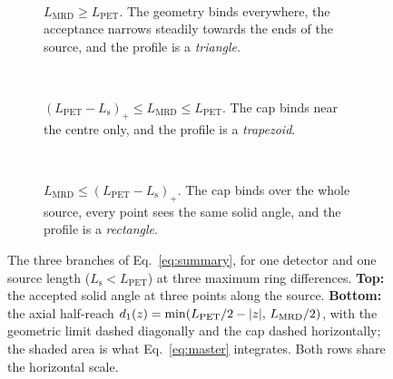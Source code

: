 \documentclass[11pt,a4paper]{article}
\newcommand{\Lpet}{L_{\mathrm{PET}}}
\newcommand{\Lsrc}{L_{\mathrm{s}}}
\newcommand{\Lmrd}{L_{\mathrm{MRD}}}
\newcommand{\Sid}{S_{\mathrm{ideal}}}
\DeclarePairedDelimiter{\abs}{\lvert}{\rvert}
\begin{document}

\begin{figure}[tbp]
\centering
\begin{subfigure}[t]{0.32\textwidth}\centering
  \\[0.6ex]
  \caption{$\Lmrd\ge \Lpet$. The geometry binds everywhere, the acceptance narrows steadily
  towards the ends of the source, and the profile is a \emph{triangle}.}
\end{subfigure}\hfill
\begin{subfigure}[t]{0.32\textwidth}\centering
  \\[0.6ex]
  \caption{$(\Lpet\!-\!\Lsrc)_+\!\le\!\Lmrd\!\le\!\Lpet$. The cap binds near the centre
  only, and the profile is a \emph{trapezoid}.}
\end{subfigure}\hfill
\begin{subfigure}[t]{0.32\textwidth}\centering
  \\[0.6ex]
  \caption{$\Lmrd\!\le\!(\Lpet\!-\!\Lsrc)_+$. The cap binds over the whole source, every
  point sees the same solid angle, and the profile is a \emph{rectangle}.}
\end{subfigure}
\caption{The three branches of Eq.~\eqref{eq:summary}, for one detector and one source
length ($\Lsrc<\Lpet$) at three maximum ring differences. \textbf{Top:} the accepted solid
angle at three points along the source. \textbf{Bottom:} the axial half-reach
$d_1(z)=\min(\Lpet/2-\abs{z},\,\Lmrd/2)$, with the geometric limit dashed diagonally and the
cap dashed horizontally; the shaded area is what Eq.~\eqref{eq:master} integrates. Both rows
share the horizontal scale.}
\label{fig:regimes}
\end{figure}
\end{document}
